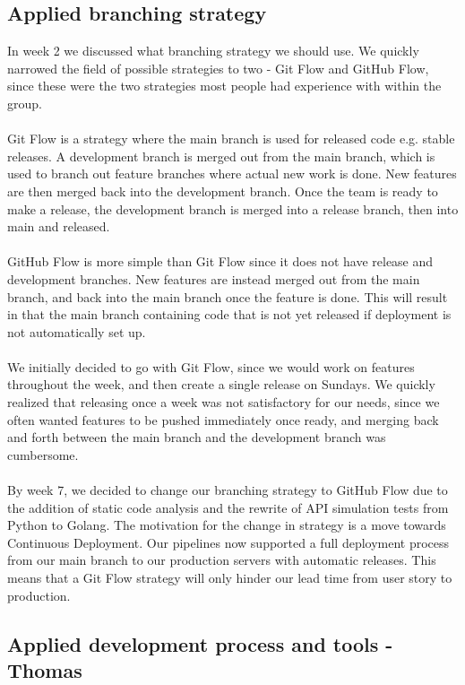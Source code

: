 \subsection{Applied branching strategy}
In week 2 we discussed what branching strategy we should use. We quickly narrowed the field of possible strategies to two - Git Flow and GitHub Flow, since these were the two strategies most people had experience with within the group. 
\\\\
Git Flow is a strategy where the main branch is used for released code e.g. stable releases. A development branch is merged out from the main branch, which is used to branch out feature branches where actual new work is done. New features are then merged back into the development branch. Once the team is ready to make a release, the development branch is merged into a release branch, then into main and released.
\\\\
GitHub Flow is more simple than Git Flow since it does not have release and development branches. New features are instead merged out from the main branch, and back into the main branch once the feature is done. This will result in that the main branch containing code that is not yet released if deployment is not automatically set up.
\\\\
We initially decided to go with Git Flow, since we would work on features throughout the week, and then create a single release on Sundays. We quickly realized that releasing once a week was not satisfactory for our needs, since we often wanted features to be pushed immediately once ready, and merging back and forth between the main branch and the development branch was cumbersome.
\\\\
By week 7, we decided to change our branching strategy to GitHub Flow due to the addition of static code analysis and the rewrite of API simulation tests from Python to Golang. The motivation for the change in strategy is a move towards Continuous Deployment. Our pipelines now supported a full deployment process from our main branch to our production servers with automatic releases. This means that a Git Flow strategy will only hinder our lead time from user story to production.

\subsection{Applied development process and tools - Thomas}
